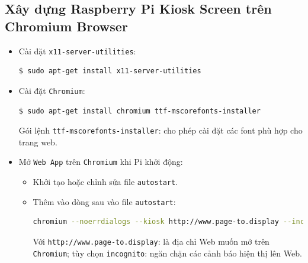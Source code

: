 \documentclass[12pt,a4paper]{article}
\begin{document}
\subsection{Xây dựng Raspberry Pi Kiosk Screen trên Chromium Browser}
	\begin{itemize}
		\item Cài đặt \verb|x11-server-utilities|:
			\begin{lstlisting}[language=bash]
$ sudo apt-get install x11-server-utilities
			\end{lstlisting}

		\item Cài đặt \verb|Chromium|:
			\begin{lstlisting}[language=bash]
$ sudo apt-get install chromium ttf-mscorefonts-installer
			\end{lstlisting}			
			Gói lệnh \verb|ttf-mscorefonts-installer|: cho phép cài đặt các font phù hợp cho trang web.
		
		\item Mở \verb|Web App| trên \verb|Chromium| khi Pi khởi động:
			\begin{itemize}
				\item Khởi tạo hoặc chỉnh sửa file \verb|autostart|.
					
				\item Thêm vào dòng sau vào file \verb|autostart|:
					\begin{lstlisting}[language=bash]
chromium --noerrdialogs --kiosk http://www.page-to.display --incognito --disable-translate
					\end{lstlisting}
					Với \verb|http://www.page-to.display|: là địa chỉ Web muốn mở trên \verb|Chromium|; tùy chọn \verb|incognito|: ngăn chặn các cảnh báo hiện thị lên Web.


\end{itemize}
\end{itemize}
\end{document}
